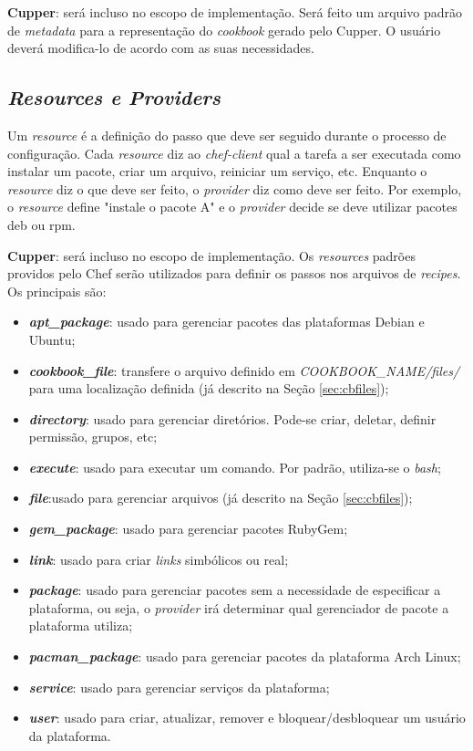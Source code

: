 \textbf{Cupper}: será incluso no escopo de implementação. Será feito um arquivo padrão de
\textit{metadata} para a representação do \textit{cookbook} gerado pelo Cupper. O usuário deverá
modifica-lo de acordo com as suas necessidades.

\subsection{\textit{Resources e Providers}}
\label{sec:cbresource}

Um \textit{resource} é a definição do passo que deve ser seguido durante o processo
de configuração. Cada \textit{resource} diz ao \textit{chef-client} qual a tarefa a ser executada
como instalar um pacote, criar um arquivo, reiniciar um serviço, etc.
Enquanto o \textit{resource} diz o que deve ser feito, o \textit{provider} diz como deve ser
feito. Por exemplo, o \textit{resource} define "instale o pacote A" e o \textit{provider} decide
se deve utilizar pacotes deb ou rpm.

\textbf{Cupper}: será incluso no escopo de implementação. Os \textit{resources} padrões
providos pelo Chef serão utilizados para definir os passos nos arquivos de
\textit{recipes}. Os principais são:

\begin{itemize}
  \item \textit{\textbf{apt\_package}}: usado para gerenciar pacotes das plataformas Debian e
    Ubuntu;
  \item \textit{\textbf{cookbook\_file}}: transfere o arquivo definido em \textit{COOKBOOK\_NAME/files/} para
    uma localização definida (já descrito na Seção \ref{sec:cbfiles});
  \item \textit{\textbf{directory}}: usado para gerenciar diretórios. Pode-se criar, deletar, definir
    permissão, grupos, etc;
  \item \textit{\textbf{execute}}: usado para executar um comando. Por padrão, utiliza-se o \textit{bash};
  \item \textit{\textbf{file}}:usado para gerenciar arquivos (já descrito na Seção \ref{sec:cbfiles});
  \item \textit{\textbf{gem\_package}}: usado para gerenciar pacotes RubyGem;
  \item \textit{\textbf{link}}: usado para criar \textit{links} simbólicos ou real;
  \item \textit{\textbf{package}}: usado para gerenciar pacotes sem a necessidade de especificar a plataforma,
    ou seja, o \textit{provider} irá determinar qual gerenciador de pacote a plataforma utiliza;
  \item \textit{\textbf{pacman\_package}}: usado para gerenciar pacotes da plataforma Arch Linux;
  \item \textit{\textbf{service}}: usado para gerenciar serviços da plataforma;
  \item \textit{\textbf{user}}: usado para criar, atualizar, remover e bloquear/desbloquear um usuário da plataforma.
\end{itemize}


